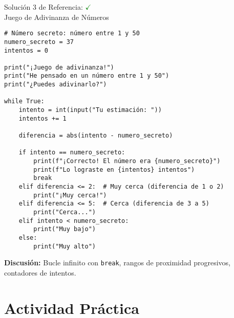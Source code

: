 \documentclass[10pt]{beamer}
\begin{document}
\begin{frame}[fragile]{Solución 3 de Referencia: \hfill \textcolor{green}{$\checkmark$} \\ Juego de Adivinanza de Números}
\begin{verbatim}
# Número secreto: número entre 1 y 50
numero_secreto = 37
intentos = 0

print("¡Juego de adivinanza!")
print("He pensado en un número entre 1 y 50")
print("¿Puedes adivinarlo?")

while True:
    intento = int(input("Tu estimación: "))
    intentos += 1
    
    diferencia = abs(intento - numero_secreto)
    
    if intento == numero_secreto:
        print(f"¡Correcto! El número era {numero_secreto}")
        print(f"Lo lograste en {intentos} intentos")
        break
    elif diferencia <= 2:  # Muy cerca (diferencia de 1 o 2)
        print("¡Muy cerca!")
    elif diferencia <= 5:  # Cerca (diferencia de 3 a 5)
        print("Cerca...")
    elif intento < numero_secreto:
        print("Muy bajo")
    else:
        print("Muy alto")
\end{verbatim}
\textbf{Discusión:} Bucle infinito con \texttt{break}, rangos de proximidad progresivos, contadores de intentos.
\end{frame}


\section{Actividad Práctica}
\end{document}

